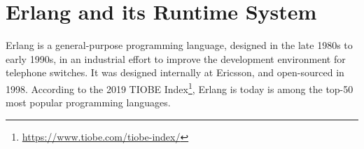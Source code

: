 \section{Erlang and its Runtime System}

Erlang is a general-purpose programming language, designed in the late
1980s to early 1990s, in an industrial effort to improve the
development environment for telephone switches. It was designed
internally at Ericsson, and open-sourced in 1998. According to the
2019 TIOBE Index\footnote{\url{https://www.tiobe.com/tiobe-index/}},
Erlang is today is among the top-50 most popular programming
languages.
